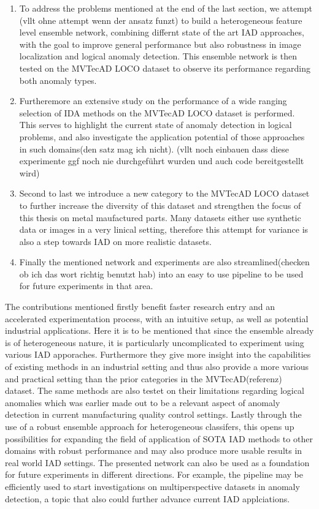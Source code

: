 \begin{enumerate}
  \item To address the problems mentioned at the end of the last section, we attempt (vllt ohne attempt wenn der ansatz funzt) 
  to build a heterogeneous feature level ensemble network, combining differnt state of the art IAD approaches, with the goal to improve 
  general performance but also robustness in image localization and logical anomaly detection. This ensemble network is then tested on 
  the MVTecAD LOCO dataset to observe its performance regarding both anomaly types.
  \item Furtheremore an extensive study on the performance of a wide ranging selection of IDA methods on the MVTecAD LOCO dataset is performed. 
  This serves to highlight the current state of anomaly detection in logical problems, and also investigate the application potential of 
  those approaches in such domains(den satz mag ich nicht). (vllt noch einbauen dass diese experimente ggf noch nie durchgeführt wurden und auch code bereitgestellt wird)
  \item Second to last we introduce a new category to the MVTecAD LOCO dataset to further increase the diversity of this dataset and strengthen the focus 
  of this thesis on metal maufactured parts. Many datasets either use synthetic data or images in a very linical setting, therefore this 
  attempt for variance is also a step towards IAD on more realistic datasets.
  \item Finally the mentioned network and experiments are also streamlined(checken ob ich das wort richtig benutzt hab) into an easy to use pipeline 
  to be used for future experiments in that area.
\end{enumerate}

The contributions mentioned firstly benefit faster research entry and an accelerated experimentation process, with an intuitive setup, 
as well as potential industrial applications. Here it is to be mentioned that since the ensemble already is of heterogeneous nature, it 
is particularly uncomplicated to experiment using various IAD apporaches.
Furthermore they give more insight into the capabilities of existing methods in an industrial setting and thus also provide a more 
various and practical setting than the prior categories in the MVTecAD(referenz) dataset. The same methods are also testet on their limitations 
regarding logical anomalies which was earlier made out to be a relevant aspect of anomaly detection in current manufacturing quality control 
settings. Lastly through the use of a robust ensemble approach for heterogeneous classifers, this opens up possibilities for expanding 
the field of application of SOTA IAD methods to other domains with robust performance and may also produce more usable results in real 
world IAD settings. The presented network can also be used as a foundation for future experiments in 
different directions. For example, the pipeline may be efficiently used to start investigations on multiperspective datasets in anomaly 
detection, a topic that also could further advance current IAD applciations.



